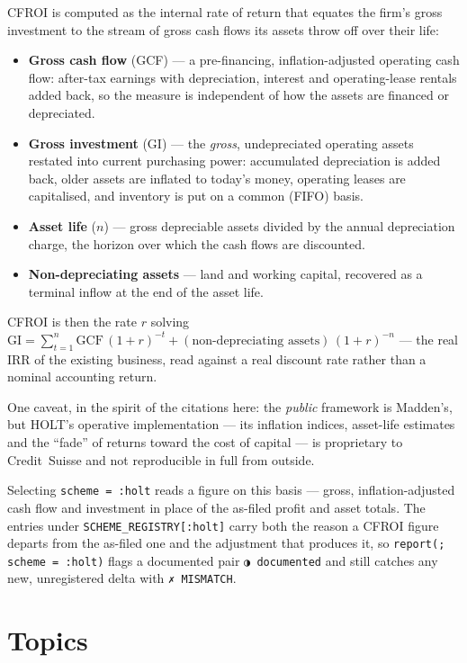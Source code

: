 \documentclass[11pt,a4paper]{report}
\newcommand{\statmark}[1]{{\symbolfont #1}}
\begin{document}
CFROI is computed as the internal rate of return that equates the firm's gross investment to the stream of
gross cash flows its assets throw off over their life:
\begin{itemize}
  \item \textbf{Gross cash flow} (GCF) --- a pre-financing, inflation-adjusted operating cash flow: after-tax
    earnings with depreciation, interest and operating-lease rentals added back, so the measure is
    independent of how the assets are financed or depreciated.
  \item \textbf{Gross investment} (GI) --- the \emph{gross}, undepreciated operating assets restated into
    current purchasing power: accumulated depreciation is added back, older assets are inflated to today's
    money, operating leases are capitalised, and inventory is put on a common (FIFO) basis.
  \item \textbf{Asset life} ($n$) --- gross depreciable assets divided by the annual depreciation charge, the
    horizon over which the cash flows are discounted.
  \item \textbf{Non-depreciating assets} --- land and working capital, recovered as a terminal inflow at the
    end of the asset life.
\end{itemize}
CFROI is then the rate $r$ solving $\mathrm{GI} = \sum_{t=1}^{n} \mathrm{GCF}\,(1+r)^{-t} +
(\text{non-depreciating assets})\,(1+r)^{-n}$ --- the real IRR of the existing business, read against a real
discount rate rather than a nominal accounting return.

One caveat, in the spirit of the citations here: the \emph{public} framework is Madden's, but HOLT's operative
implementation --- its inflation indices, asset-life estimates and the ``fade'' of returns toward the cost of
capital --- is proprietary to Credit~Suisse and not reproducible in full from outside.

Selecting \texttt{scheme = :holt} reads a figure on this basis --- gross, inflation-adjusted cash flow and
investment in place of the as-filed profit and asset totals. The entries under
\texttt{SCHEME\_REGISTRY[:holt]} carry both the reason a CFROI figure departs from the as-filed one and the
adjustment that produces it, so \texttt{report(; scheme = :holt)} flags a documented pair
\texttt{\statmark{◑}~documented} and still catches any new, unregistered delta with \texttt{\statmark{✗}~MISMATCH}.

\section{Topics}
\label{sec:schemes-topics}
\end{document}
